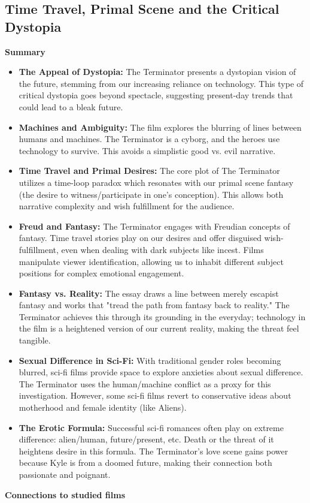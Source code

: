 \documentclass[11pt,fleqn]{book} %
\begin{document}
\subsection{Time Travel, Primal Scene and the Critical Dystopia}
\textbf{Summary}

\begin{itemize}
\item \textbf{The Appeal of Dystopia:} The Terminator presents a dystopian vision of the future, stemming from our increasing reliance on technology.  This type of critical dystopia goes beyond spectacle, suggesting present-day trends that could lead to a bleak future.

\item \textbf{Machines and Ambiguity:}  The film explores the blurring of lines between humans and machines. The Terminator is a cyborg, and the heroes use technology to survive. This avoids a simplistic good vs. evil narrative.

\item \textbf{Time Travel and Primal Desires:}  The core plot of The Terminator utilizes a time-loop paradox which resonates with our primal scene fantasy (the desire to witness/participate in one's conception). This allows both narrative complexity and wish fulfillment for the audience.

\item \textbf{Freud and Fantasy:}  The Terminator engages with Freudian concepts of fantasy. Time travel stories play on our desires and offer disguised wish-fulfillment, even when dealing with dark subjects like incest. Films manipulate viewer identification, allowing us to inhabit different subject positions for complex emotional engagement.

\item \textbf{Fantasy vs. Reality:} The essay draws a line between merely escapist fantasy and works that "tread the path from fantasy back to reality."  The Terminator achieves this through its grounding in the everyday; technology in the film is a heightened version of our current reality, making the threat feel tangible.

\item \textbf{Sexual Difference in Sci-Fi:} With traditional gender roles becoming blurred, sci-fi films provide space to explore anxieties about sexual difference.  The Terminator uses the human/machine conflict as a proxy for this investigation. However, some sci-fi films revert to conservative ideas about motherhood and female identity (like Aliens).

\item \textbf{The Erotic Formula:}  Successful sci-fi romances often play on extreme difference: alien/human, future/present, etc.  Death or the threat of it heightens desire in this formula. The Terminator's love scene gains power because Kyle is from a doomed future, making their connection both passionate and poignant.
\end{itemize}
\vspace{5pt}
\textbf{Connections to studied films}
\end{document}
